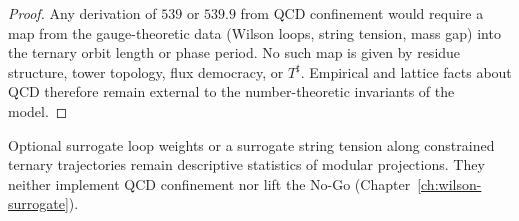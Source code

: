 \begin{proof}
Any derivation of \(539\) or \(539.9\) from QCD confinement would require a
map from the gauge-theoretic data (Wilson loops, string tension, mass gap) into
the ternary orbit length or phase period. No such map is given by residue
structure, tower topology, flux democracy, or \(T^\sharp\). Empirical and
lattice facts about QCD therefore remain external to the number-theoretic
invariants of the model.
\end{proof}

\begin{corollary}
Optional surrogate loop weights or a surrogate string tension along constrained
ternary trajectories remain descriptive statistics of modular projections. They
neither implement QCD confinement nor lift the No-Go
(Chapter~\ref{ch:wilson-surrogate}).
\end{corollary}

